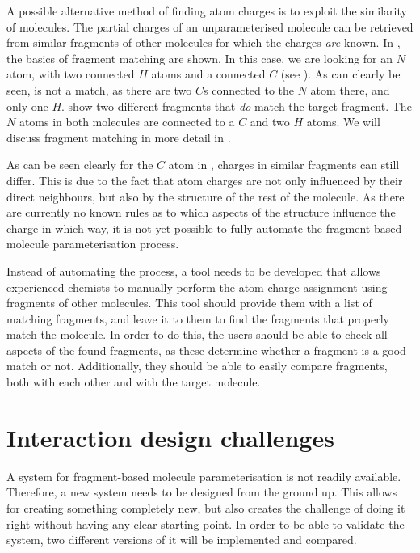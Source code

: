 A possible alternative method of finding atom charges is to exploit the similarity of molecules. The partial charges of an unparameterised molecule can be retrieved from similar fragments of other molecules for which the charges \emph{are} known. In , the basics of fragment matching are shown. In this case, we are looking for an $N$ atom, with two connected $H$ atoms and a connected $C$ (see ). As can clearly be seen,  is not a match, as there are two $C$s connected to the $N$ atom there, and only one $H$.  show two different fragments that \emph{do} match the target fragment. The $N$ atoms in both molecules are connected to a $C$ and two $H$ atoms. We will discuss fragment matching in more detail in .

As can be seen clearly for the $C$ atom in , charges in similar fragments can still differ. This is due to the fact that atom charges are not only influenced by their direct neighbours, but also by the structure of the rest of the molecule. As there are currently no known rules as to which aspects of the structure influence the charge in which way, it is not yet possible to fully automate the fragment-based molecule parameterisation process.

Instead of automating the process, a tool needs to be developed that allows experienced chemists to manually perform the atom charge assignment using fragments of other molecules. This tool should provide them with a list of matching fragments, and leave it to them to find the fragments that properly match the molecule. In order to do this, the users should be able to check all aspects of the found fragments, as these determine whether a fragment is a good match or not. Additionally, they should be able to easily compare fragments, both with each other and with the target molecule.



\section[Challenges]{Interaction design challenges}
A system for fragment-based molecule parameterisation is not readily available. Therefore, a new system needs to be designed from the ground up. This allows for creating something completely new, but also creates the challenge of doing it right without having any clear starting point. In order to be able to validate the system, two different versions of it will be implemented and compared.

